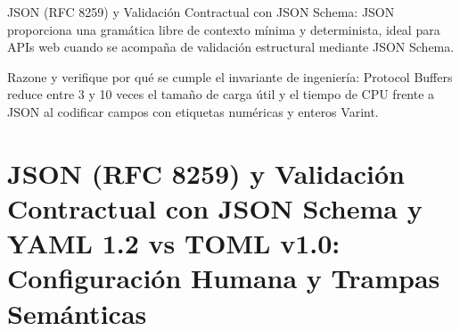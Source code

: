 \documentclass{book}
\begin{document}
\begin{tcolorbox}[title={Definición}, studiumdef, breakable]

JSON (RFC 8259) y Validación Contractual con JSON Schema: JSON proporciona una gramática libre de contexto mínima y determinista, ideal para APIs web cuando se acompaña de validación estructural mediante JSON Schema.
\end{tcolorbox}

\begin{tcolorbox}[title={Autoficha}, studiumcheck, breakable]

Razone y verifique por qué se cumple el invariante de ingeniería: Protocol Buffers reduce entre 3 y 10 veces el tamaño de carga útil y el tiempo de CPU frente a JSON al codificar campos con etiquetas numéricas y enteros Varint.
\end{tcolorbox}

\section{JSON (RFC 8259) y Validación Contractual con JSON Schema y YAML 1.2 vs TOML v1.0: Configuración Humana y Trampas Semánticas}
\end{document}
